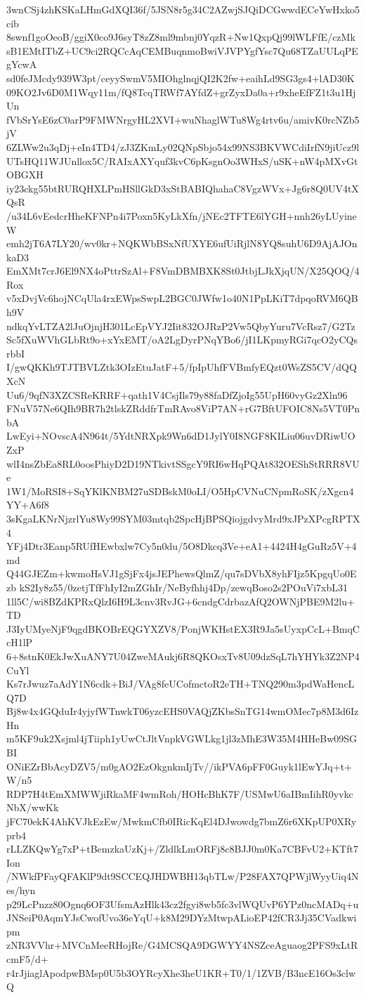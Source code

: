 3wnCSj4zhKSKaLHmGdXQI36f/5JSN8r5g34C2AZwjSJQiDCGwwdECeYwHxko5cib
8swnf1goOeoB/ggiX0co9J6syT8zZ8ml9mbnj0YqzR+Nw1QxpQj99lWLFfE/czMk
sB1EMtITbZ+UC9ci2RQCcAqCEMBuqnmoBwiVJVPYgfYsc7Qu68TZaUULqPEgYcwA
sd0feJMcdy939W3pt/ceyySwmV5MIOhglnqjQI2K2fw+eaihLd9SG3gs4+lAD30K
09KO2Jv6D0M1Wqy11m/fQ8TcqTRWf7AYfdZ+grZyxDa0a+r9xheEfFZ1t3u1HjUn
fVbSrYsE6zC0arP9FMWNrgyHL2XVI+wuNhaglWTu8Wg4rtv6u/amivK0rcNZb5jV
6ZLWw2u3qDj+eIn4TD4/zJ3ZKmLy02QNpSbjo54x99NS3BKVWCdiIrfN9jiUcz9l
UTsHQ11WJUnllox5C/RAIxAXYquf3kvC6pKsgnOo3WHxS/uSK+nW4pMXvGtOBGXH
iy23ckg55btRURQHXLPmHSllGkD3xStBABIQhahaC8VgzWVx+Jg6r8Q0UV4tXQsR
/u34L6vEedcrHheKFNPn4i7Poxn5KyLkXfn/jNEc2TFTE6lYGH+nnh26yLUyineW
emh2jT6A7LY20/wv0kr+NQKWbBSxNfUXYE6ufUiRjlN8YQ8suhU6D9AjAJOnkaD3
EmXMt7crJ6El9NX4oPttrSzAl+F8VmDBMBXK8St0JtbjLJkXjqUN/X25QOQ/4Rox
v5xDvjVc6hojNCqUla4rxEWpsSwpL2BGC0JWfw1o40N1PpLKiT7dpqoRVM6QBh9V
ndkqYvLTZA2lJuOjnjH301LcEpVYJ2Iit832OJRzP2Vw5QbyYuru7VcRsz7/G2Tz
Sc5fXuWVhGLbRt9o+xYxEMT/oA2LgDyrPNqYBo6/jI1LKpmyRGi7qcO2yCQsrbbI
I/gwQKKh9TJTBVLZtk3OIzEtuJatF+5/fpIpUhfFVBmfyEQzt0WsZS5CV/dQQXcN
Uu6/9qfN3XZCSReKRRF+qath1V4CsjIls79y88faDfZjoIg55UpH60vyGz2Xln96
FNuV57Ne6QIh9BR7h2tlskZRddfrTmRAvo8ViP7AN+rG7BftUFOIC8Ns5VT0PnbA
LwEyi+NOvscA4N964t/5YdtNRXpk9Wn6dD1JylY0I8NGF8KILiu06uvDRiwUOZxP
wlI4nsZbEa8RL0oosPhiyD2D19NTkivtSSgcY9RI6wHqPQAt832OEShStRRR8VUe
1W1/MoRSI8+SqYKlKNBM27uSDBskM0oLI/O5HpCVNuCNpmRoSK/zXgcn4YY+A6f8
3sKgaLKNrNjzrlYu8Wy99SYM03mtqb2SpcHjBPSQiojgdvyMrd9xJPzXPcgRPTX4
YFj4Dtr3Eanp5RUfHEwbxlw7Cy5n0du/5O8Dkcq3Ve+eA1+4424H4gGuRz5V+4md
Q44GJEZm+kwmoHsVJ1gSjFx4jsJEPhewsQlmZ/qu7sDVbX8yhFIjz5KpgqUo0Ezb
kS2Iy8z55/0zetjTfFhIyI2mZGhIr/NeByfhhj4Dp/zewqBoso2s2POuVi7xbL31
1ll5C/wi8BZdKPRxQlzI6H9L3cnv3RvJG+6cndgCdrbazAfQ2OWNjPBE9M2lu+TD
J3IyUMyeNjF9qgdBKOBrEQGYXZV8/PonjWKHstEX3R9Ja5sUyxpCcL+BmqCcH1lP
6+8stnK0EkJwXuANY7U04ZweMAukj6R8QKOsxTv8U09dzSqL7hYHYk3Z2NP4CuYl
Ks7rJwuz7aAdY1N6cdk+BiJ/VAg8feUCofmctoR2eTH+TNQ290m3pdWaHencLQ7D
Bj8w4x4GQduIr4yjyfWTnwkT06yzcEHS0VAQjZKbsSnTG14wmOMec7p8M3d6IzHn
m5KF9uk2Xsjml4jTiiph1yUwCtJltVnpkVGWLkg1jl3zMhE3W35M4HHeBw09SGBI
ONiEZrBbAcyDZV5/m0gAO2EzOkgnkmIjTv//ikPVA6pFF0Guyk1lEwYJq+t+W/n5
RDP7H4tEmXMWWjiRkaMF4wmRoh/HOHcBhK7F/USMwU6aIBmIihR0yvkcNbX/wwKk
jFC70ekK4AhKVJkEzEw/MwkmCfb0IRicKqEl4DJwowdg7bmZ6r6XKpUP0XRyprb4
rLLZKQwYg7xP+tBemzkaUzKj+/ZldlkLmORFj8c8BJJ0m0Ka7CBFvU2+KTft7Ion
/NWkfPFayQFAKlP9dt9SCCEQJHDWBH13qbTLw/P28FAX7QPWjlWyyUiq4Nes/hyn
p29LcPnzz80Ognq6OF3UfsmAzHlk43cz2fgyi8wb5fc3vlWQUvP6YPz0ncMADq+u
JNSeiP0AqmYJsCwofUvo36eYqU+k8M29DYzMtwpALioEP42fCR3Jj35CVadkwipm
zNR3VVhr+MVCnMeeRHojRe/G4MCSQA9DGWYY4NSZceAguaog2PFS9xLtRcmF5/d+
r4rJjiaglApodpwBMsp0U5b3OYRcyXhe3heU1KR+T0/1/1ZVB/B3ncE16Os3clwQ
